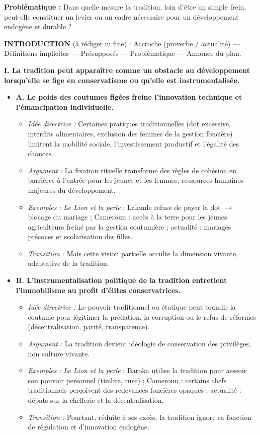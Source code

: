 \documentclass[11pt]{article}
\begin{document}
\begin{exoresolu}
\textbf{Problématique :} Dans quelle mesure la tradition, loin d'être un simple frein, peut-elle constituer un levier ou un cadre nécessaire pour un développement endogène et durable ?

\bigskip
\textbf{INTRODUCTION} (à rédiger in fine) : Accroche (proverbe / actualité) — Définitions implicites — Présupposés — Problématique — Annonce du plan.

\bigskip
\textbf{I. La tradition peut apparaître comme un obstacle au développement lorsqu'elle se fige en conservatisme ou qu'elle est instrumentalisée.}
\begin{itemize}
\item \textbf{A. Le poids des coutumes figées freine l'innovation technique et l'émancipation individuelle.}
      \begin{itemize}
      \item \textit{Idée directrice :} Certaines pratiques traditionnelles (dot excessive, interdits alimentaires, exclusion des femmes de la gestion foncière) limitent la mobilité sociale, l'investissement productif et l'égalité des chances.
      \item \textit{Argument :} La fixation rituelle transforme des règles de cohésion en barrières à l'entrée pour les jeunes et les femmes, ressources humaines majeures du développement.
      \item \textit{Exemples :} \emph{Le Lion et la perle} : Lakunle refuse de payer la dot $\rightarrow$ blocage du mariage ; Cameroun : accès à la terre pour les jeunes agriculteurs freiné par la gestion coutumière ; actualité : mariages précoces et scolarisation des filles.
      \item \textit{Transition :} Mais cette vision partielle occulte la dimension vivante, adaptative de la tradition.
      \end{itemize}
\item \textbf{B. L'instrumentalisation politique de la tradition entretient l'immobilisme au profit d'élites conservatrices.}
      \begin{itemize}
      \item \textit{Idée directrice :} Le pouvoir traditionnel ou étatique peut brandir la \og coutume \fg pour légitimer la prédation, la corruption ou le refus de réformes (décentralisation, parité, transparence).
      \item \textit{Argument :} La tradition devient idéologie de conservation des privilèges, non culture vivante.
      \item \textit{Exemples :} \emph{Le Lion et la perle} : Baroka utilise la tradition pour asseoir son pouvoir personnel (timbre, ruse) ; Cameroun : certains chefs traditionnels perçoivent des redevances foncières opaques ; actualité : débats sur la chefferie et la décentralisation.
      \item \textit{Transition :} Pourtant, réduite à ses excès, la tradition ignore sa fonction de régulation et d'innovation endogène.
      \end{itemize}
\end{itemize}


\end{exoresolu}
\end{document}
